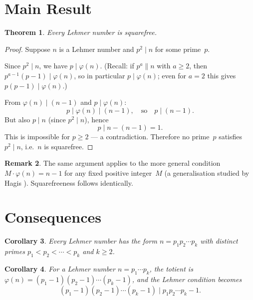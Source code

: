 \documentclass[12pt,a4paper]{amsart}
\newtheorem{theorem}{Theorem}[section]
\newtheorem{corollary}[theorem]{Corollary}
\theoremstyle{definition}
\newtheorem{remark}[theorem]{Remark}
\newcommand{\euler}{\varphi}
\begin{document}
\section{Main Result}

\begin{theorem}
\label{thm:sqfree}
Every Lehmer number is squarefree.
\end{theorem}

\begin{proof}
Suppose $n$ is a Lehmer number and $p^2 \mid n$ for some prime~$p$.

Since $p^2 \mid n$, we have $p \mid \euler(n)$.
(Recall: if $p^a \| n$ with $a \ge 2$, then $p^{a-1}(p-1) \mid \euler(n)$,
so in particular $p \mid \euler(n)$; even for $a = 2$ this gives $p(p-1) \mid \euler(n)$.)

From $\euler(n) \mid (n-1)$ and $p \mid \euler(n)$:
\[
  p \mid \euler(n) \mid (n-1), \quad \text{so} \quad p \mid (n-1).
\]
But also $p \mid n$ (since $p^2 \mid n$), hence
\[
  p \mid n - (n-1) = 1.
\]
This is impossible for $p \ge 2$ — a contradiction.
Therefore no prime~$p$ satisfies $p^2 \mid n$, i.e.\ $n$ is squarefree.
\end{proof}

\begin{remark}
The same argument applies to the more general condition $M \cdot \euler(n) = n - 1$
for any fixed positive integer~$M$ (a generalisation studied by Hagis \cite{Hagis1988}).
Squarefreeness follows identically.
\end{remark}

\section{Consequences}

\begin{corollary}
Every Lehmer number has the form $n = p_1 p_2 \cdots p_k$ with distinct primes
$p_1 < p_2 < \cdots < p_k$ and $k \ge 2$.
\end{corollary}

\begin{corollary}
For a Lehmer number $n = p_1 \cdots p_k$, the totient is
$\euler(n) = (p_1-1)(p_2-1)\cdots(p_k-1)$, and the Lehmer condition becomes
\[
  (p_1-1)(p_2-1)\cdots(p_k-1) \mid p_1 p_2 \cdots p_k - 1.
\]
\end{corollary}
\end{document}
